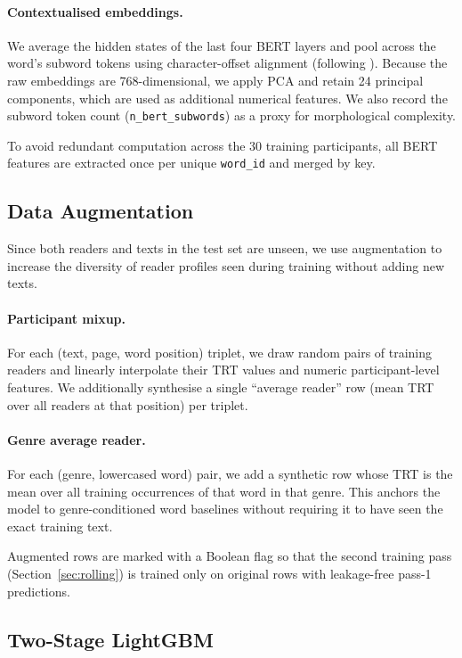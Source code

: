 \documentclass[12pt]{article}
\begin{document}
\paragraph{Contextualised embeddings.}
We average the hidden states of the last four BERT layers and pool across the word's subword tokens using character-offset alignment (following \citealt{hodivoianu2025predicting}). Because the raw embeddings are 768-dimensional, we apply PCA and retain 24 principal components, which are used as additional numerical features. We also record the subword token count (\texttt{n\_bert\_subwords}) as a proxy for morphological complexity.

To avoid redundant computation across the 30 training participants, all BERT features are extracted once per unique \texttt{word\_id} and merged by key.

\subsection{Data Augmentation}

Since both readers and texts in the test set are unseen, we use augmentation to increase the diversity of reader profiles seen during training without adding new texts.

\paragraph{Participant mixup.}
For each (text, page, word position) triplet, we draw random pairs of training readers and linearly interpolate their TRT values and numeric participant-level features. We additionally synthesise a single ``average reader'' row (mean TRT over all readers at that position) per triplet.

\paragraph{Genre average reader.}
For each (genre, lowercased word) pair, we add a synthetic row whose TRT is the mean over all training occurrences of that word in that genre. This anchors the model to genre-conditioned word baselines without requiring it to have seen the exact training text.

Augmented rows are marked with a Boolean flag so that the second training pass (Section~\ref{sec:rolling}) is trained only on original rows with leakage-free pass-1 predictions.

\subsection{Two-Stage LightGBM}
\label{sec:lgbm}
\end{document}
